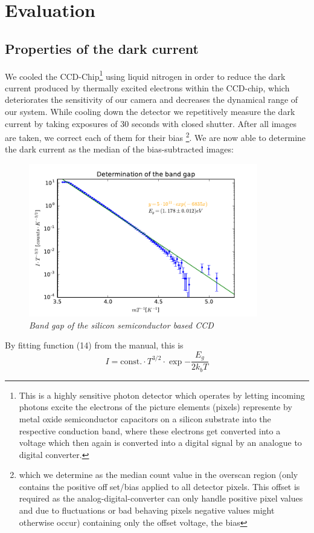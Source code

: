 \section{Evaluation}
\subsection{Properties of the dark current}
We cooled the CCD-Chip\footnote[1]{This is a highly sensitive photon detector which operates by letting incoming photons excite the electrons of the picture elements (pixels) represente by metal oxide semiconductor capacitors on a silicon substrate into the respective conduction band, where these electrons get converted into a voltage which then again is converted into a digital signal by an analogue to digital converter.} using liquid nitrogen in order to reduce the dark current produced by thermally excited electrons within the CCD-chip, which deteriorates the sensitivity of our camera and decreases the dynamical range of our system. While cooling down the detector we repetitively measure the dark current by taking exposures of 30 seconds with closed shutter. After all images are taken, we correct each of them for their bias \footnote[2]{which we determine as the median count value in the overscan region (only contains the positive offset/bias applied to all detector pixels. This offset is required as the analog-digital-converter can only handle positive pixel values and due to fluctuations or bad behaving pixels negative values might otherwise occur) containing only the offset voltage, the bias}. We are now able to determine the dark current as the median of the bias-subtracted images:

\begin{figure}[h]
	\includegraphics[width=100mm]{diag2}
	\centering
	\caption{ \itshape Band gap of the silicon semiconductor based CCD }
	\label{fig:Abbildung 2}
\end{figure}
\noindent
By fitting function (14) from the manual, this is
\[I = \mathrm{const.}\cdot T^{3/2}\cdot \exp{-\frac{E_g}{2k_bT}}\]

